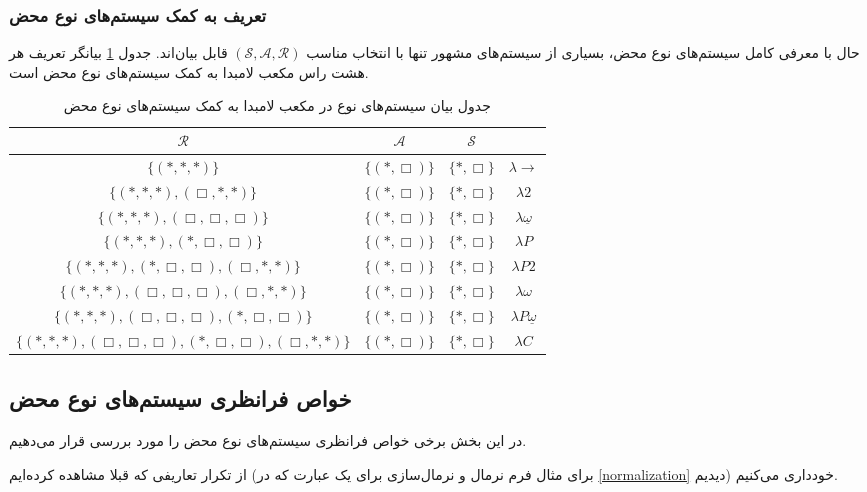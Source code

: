 \subsubsection{تعریف به کمک سیستم‌های نوع محض}

حال با معرفی کامل سیستم‌های نوع محض، بسیاری از سیستم‌های مشهور تنها با انتخاب مناسب
$(\mathcal{S},\mathcal{A},\mathcal{R})$
قابل بیان‌اند. جدول
\ref{lambda_cube_pts}
بیانگر تعریف هر هشت راس مکعب لامبدا به کمک سیستم‌های نوع محض است.

\begin{table}[h!]
\centering
\begin{tabular}{c|c|c|c}
$\mathcal{R}$&$\mathcal{A}$&$\mathcal{S}$&\\[0.1cm]
\hline\hline
$\{(*,*,*)\}$&$\{(*,\Box)\}$&$\{*,\Box\}$&$\lambda \to$\\[0.3cm]
$\{(*,*,*),(\Box,*,*)\}$&$\{(*,\Box)\}$&$\{*,\Box\}$&$\lambda 2$\\[0.3cm]
$\{(*,*,*),(\Box,\Box,\Box)\}$&$\{(*,\Box)\}$&$\{*,\Box\}$&$\lambda \underline{\omega}$\\[0.3cm]
$\{(*,*,*),(*,\Box,\Box)\}$&$\{(*,\Box)\}$&$\{*,\Box\}$&$\lambda P$\\[0.3cm]
$\{(*,*,*),(*,\Box,\Box),(\Box,*,*)\}$&$\{(*,\Box)\}$&$\{*,\Box\}$&$\lambda P2$\\[0.3cm]
$\{(*,*,*),(\Box,\Box,\Box),(\Box,*,*)\}$&$\{(*,\Box)\}$&$\{*,\Box\}$&$\lambda \omega$\\[0.3cm]
$\{(*,*,*),(\Box,\Box,\Box),(*,\Box,\Box)\}$&$\{(*,\Box)\}$&$\{*,\Box\}$&$\lambda P\underline{\omega}$\\[0.3cm]
$\{(*,*,*),(\Box,\Box,\Box),(*,\Box,\Box),(\Box,*,*)\}$&$\{(*,\Box)\}$&$\{*,\Box\}$&$\lambda C$\\[0.3cm]
\end{tabular}
\caption{جدول بیان سیستم‌های نوع در مکعب لامبدا به کمک سیستم‌های نوع محض}
\label{lambda_cube_pts}
\end{table}

\subsection*{خواص فرانظری سیستم‌های نوع محض}

در این بخش برخی خواص فرانظری سیستم‌های نوع محض را مورد بررسی قرار می‌دهیم.

\begin{rem}
از تکرار تعاریفی که قبلا مشاهده کرده‌ایم
(برای مثال فرم نرمال و نرمال‌سازی برای یک عبارت که در
\ref{normalization}
دیدیم)
خودداری می‌کنیم.
\end{rem}

